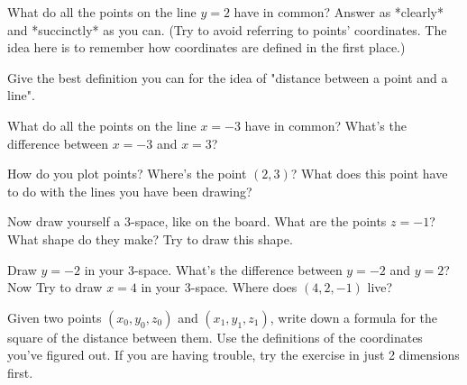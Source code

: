 \documentclass[12pt]{exam}
\theoremstyle{definition}
\begin{document}
\begin{questions}

\question
What do all the points on the line $y = 2$ have in common? Answer as *clearly* and *succinctly* as you can. (Try to avoid referring to points' coordinates. The idea here is to remember how coordinates are defined in the first place.)

\question
Give the best definition you can for the idea of "distance between a point and a line".

\question
What do all the points on the line $x = -3$ have in common? What's the difference between $x = -3$ and $x = 3$?

\question 
How do you plot points? Where's the point $(2, 3)$? What does this point have to do with the lines you have been drawing?

\question
Now draw yourself a 3-space, like on the board. What are the points $z = -1$? What shape do they make? Try to draw this shape.

\question 
Draw $y = -2$ in your 3-space. What's the difference between $y = -2$ and $y = 2$? Now Try to draw $x = 4$ in your 3-space. Where does $(4, 2, -1)$ live?

\question 
Given two points $(x_0, y_0, z_0)$ and $(x_1, y_1, z_1)$, write down a formula for the square of the distance between them. Use the definitions of the coordinates you've figured out. If you are having trouble, try the exercise in just 2 dimensions first.

\end{questions} 
\end{document}
